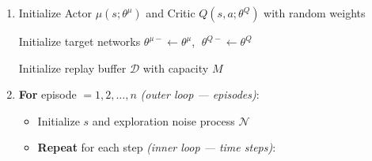 \documentclass[11pt]{article}
\providecommand{\tightlist}{%
      \setlength{\itemsep}{0pt}\setlength{\parskip}{0pt}}
\begin{document}
\begin{enumerate}
\def\labelenumi{\arabic{enumi}.}
\item
  Initialize Actor \(\mu(s;\theta^\mu)\) and Critic \(Q(s,a;\theta^Q)\)
  with random weights

  Initialize target networks \(\theta^{\mu-} \leftarrow \theta^\mu\),
  \(\;\theta^{Q-} \leftarrow \theta^Q\)

  Initialize replay buffer \(\mathcal{D}\) with capacity \(M\)
\item
  \textbf{For} episode \(= 1, 2, \ldots, n\) \emph{(outer loop ---
  episodes)}:

  \begin{itemize}
  \tightlist
  \item
    Initialize \(s\) and exploration noise process \(\mathcal{N}\)
  \item
    \textbf{Repeat} for each step \emph{(inner loop --- time steps)}:


\end{itemize}
\end{enumerate}
\end{document}
